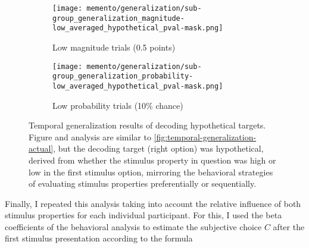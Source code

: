 \begin{figure}[H]
	\begin{subfigure}[c]{0.5\textwidth}
		\texttt{[image: memento/generalization/sub-group\_generalization\_magnitude-low\_averaged\_hypothetical\_pval-mask.png]}
		\caption{Low magnitude trials (0.5 points)}
		\label{fig:generalization-mag-low-hypothetical}
	\end{subfigure}
	\begin{subfigure}[c]{0.5\textwidth}
		\texttt{[image: memento/generalization/sub-group\_generalization\_probability-low\_averaged\_hypothetical\_pval-mask.png]}
		\caption{Low probability trials (10\% chance)}
		\label{fig:generalization-prob-low-hypothetical}
	\end{subfigure}
	\caption[Temporal generalization: Hypothetical choice]{Temporal generalization results of decoding hypothetical targets. Figure and analysis are similar to \ref{fig:temporal-generalization-actual}, but the decoding target (right option) was hypothetical, derived from whether the stimulus property in question was high or low in the first stimulus option, mirroring the behavioral strategies of evaluating stimulus properties preferentially or sequentially.}
	\label{fig:temporal-generalization-hypothetical}
\end{figure}

Finally, I repeated this analysis taking into account the relative influence of both stimulus properties for each individual participant.
For this, I used the beta coefficients of the behavioral analysis to estimate the subjective choice $C$ after the first stimulus presentation according to the formula

